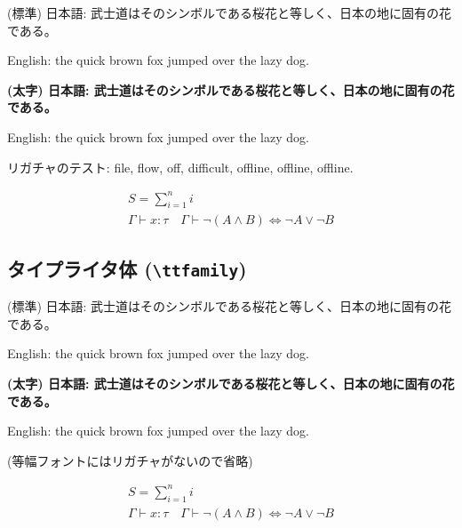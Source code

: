 \documentclass[xelatex,a4paper,ja=standard]{bxjsarticle}
\newcommand{\jasample}{武士道はそのシンボルである桜花と等しく、日本の地に固有の花である。}
\begin{document}
\sffamily\LARGE

{\mdseries (標準) 日本語: \jasample

English: the quick brown fox jumped over the lazy dog.}

{\bfseries (太字) 日本語: \jasample

English: the quick brown fox jumped over the lazy dog.}



{\mdseries リガチャのテスト: file, flow, off, difficult, offline, off\/line, off\textcompwordmark line.}

\normalsize
\begin{gather*}
    S = \sum_{i=1}^n i \\
    \Gamma \vdash x \colon \tau \quad \Gamma \vdash {\neg(A\land B)} \iff {\neg A} \lor {\neg B}
\end{gather*}

\subsection{タイプライタ体 (\texttt{\textbackslash ttfamily})}

\ttfamily\LARGE

{\mdseries (標準) 日本語: \jasample

English: the quick brown fox jumped over the lazy dog.}

{\bfseries (太字) 日本語: \jasample

English: the quick brown fox jumped over the lazy dog.}

\normalsize
(等幅フォントにはリガチャがないので省略)

\begin{gather*}
    S = \sum_{i=1}^n i \\
    \Gamma \vdash x \colon \tau \quad \Gamma \vdash {\neg(A\land B)} \iff {\neg A} \lor {\neg B}
\end{gather*}
\end{document}
